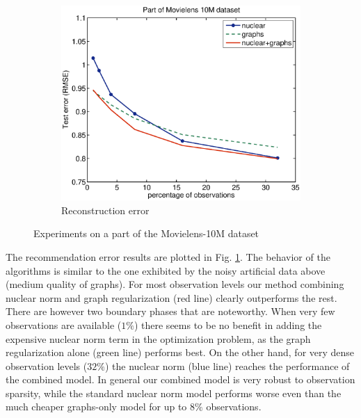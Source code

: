\documentclass{article}
\begin{document}
\begin{figure}
\begin{subfigure}[b]{.5\linewidth}
            \centering\includegraphics[scale=.38, trim=40 0 0 0, clip=true]{movielens_32_percent_lin_scale.eps}
            \caption{Reconstruction error}\label{fig:real_final}
          \end{subfigure}
         \caption{Experiments on a part of the Movielens-10M dataset}\label{fig:data_real}
	\vspace{-0.25cm}
\end{figure}
The recommendation error results are plotted in Fig. \ref{fig:real_final}. 
The behavior of the algorithms is similar to the one exhibited by the noisy artificial data above (medium quality of graphs). For most observation levels our method combining nuclear norm and graph regularization (red line) clearly outperforms the rest. There are however two boundary phases that are noteworthy. When very few observations are available ($1\%$) there seems to be no benefit in adding the expensive nuclear norm term in the optimization problem, as the graph regularization alone (green line) performs best. On the other hand, for very dense observation levels ($32\%$) the nuclear norm (blue line) reaches the performance of the combined model. In general our combined model is very robust to observation sparsity, while the standard nuclear norm model performs worse even than the much cheaper graphs-only model for up to $8\%$ observations.
\end{document}
